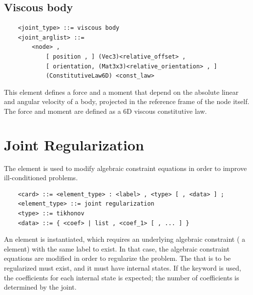 \subsection{Viscous body}
\label{sec:EL:STRUCT:JOINT:VISCOUS_BODY}
\begin{verbatim}
    <joint_type> ::= viscous body
    <joint_arglist> ::=
        <node> ,
            [ position , ] (Vec3)<relative_offset> ,
            [ orientation, (Mat3x3)<relative_orientation> , ]
            (ConstitutiveLaw6D) <const_law>
\end{verbatim}
This element defines a force and a moment that depend on the absolute 
linear and angular velocity of a body, projected in the reference frame
of the node itself.
The force and moment are defined as a 6D viscous constitutive law.



\section{Joint Regularization}
The  element is used to modify
algebraic constraint equations in order to improve ill-conditioned
problems.

\begin{verbatim}
    <card> ::= <element_type> : <label> , <type> [ , <data> ] ;
    <element_type> ::= joint regularization
    <type> ::= tikhonov
    <data> ::= { <coef> | list , <coef_1> [ , ... ] }
\end{verbatim}
An element is instantiated, which requires
an underlying algebraic constraint ( a  element)
with the same label to exist.
In that case, the algebraic constraint equations are modified
in order to regularize the problem.
The  that is to be regularized must exist,
and it must have internal states.
If the keyword  is used, the coefficients for each internal state
is expected; the number of coefficients is determined by the joint.

